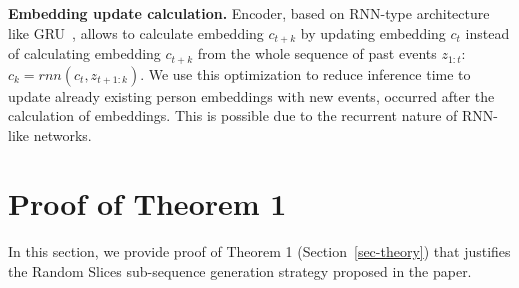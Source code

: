\documentclass[sigconf]{acmart}
\newtheorem{thm}{Theorem}
\renewcommand{\P}{\mathbb{P}}
\begin{document}
\textbf{Embedding update calculation.} Encoder, based on RNN-type architecture like GRU~\citep{Cho2014LearningPR}, allows to calculate embedding $c_{t+k}$ by updating embedding $c_t$ instead of  calculating embedding $c_{t+k}$ from the whole sequence of past events $z_{1:t}$: $c_k = rnn(c_t, z_{t+1:k})$. We use this optimization to reduce inference time to update already existing person embeddings with new events, occurred after the calculation of embeddings. This is possible due to the recurrent nature of RNN-like networks.

\section{Proof of Theorem 1} \label{app-sec-proof}

In this section, we provide proof of Theorem 1 (Section~\ref{sec-theory}) that justifies the Random Slices sub-sequence generation strategy proposed in the paper.


\end{document}
